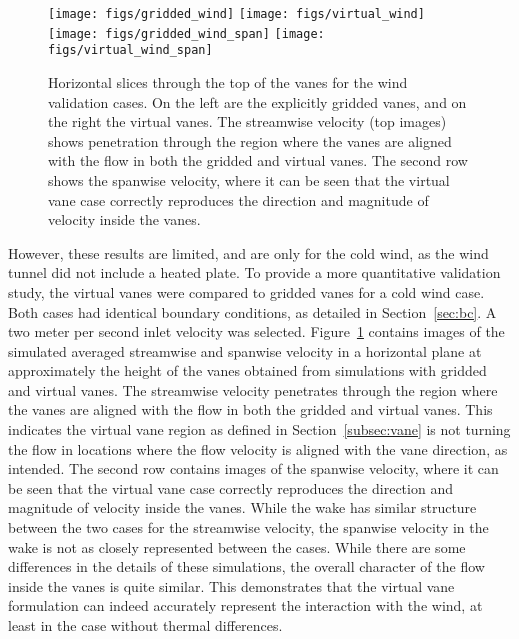 \begin{figure}
  \centering
  \texttt{[image: figs/gridded\_wind]}
  \hfill
  \texttt{[image: figs/virtual\_wind]}
  \\
  \texttt{[image: figs/gridded\_wind\_span]}
  \hfill
  \texttt{[image: figs/virtual\_wind\_span]}
 \caption{Horizontal slices through the top of the vanes for the
 wind validation cases. On the left are the explicitly gridded vanes,
 and on the right the virtual vanes. The streamwise velocity (top
 images) shows penetration through the region where the vanes are aligned
 with the flow in both the gridded and virtual vanes. The second row
 shows the spanwise velocity, where it can be seen that the virtual vane
 case correctly reproduces the direction and magnitude of velocity
 inside the vanes.} 
 \label{fig:wind_val}
\end{figure}

%
%
%
However, these results are limited, and are
only for the cold wind, as the wind tunnel did not include a heated plate.
To provide a more quantitative validation study, the virtual vanes were
compared to gridded vanes for a cold wind case. Both cases had identical
boundary conditions, as detailed in Section~\ref{sec:bc}. A two meter
per second inlet velocity was selected. Figure~\ref{fig:wind_val}
contains images of the simulated averaged 
streamwise and  spanwise velocity in a horizontal plane at approximately
the height of the vanes obtained from simulations with gridded and
virtual vanes. 
The streamwise velocity penetrates through the region where the vanes
are aligned with the flow in both the gridded and virtual vanes. This
indicates the virtual vane region as defined in
Section~\ref{subsec:vane} is not turning the flow in locations where
the flow velocity is aligned with the vane direction, as intended. 
The second row contains images of the spanwise velocity, where it can be
seen that the virtual vane case correctly reproduces the direction and
magnitude of velocity inside the vanes. While the wake has similar
structure between the two cases for the streamwise velocity, the
spanwise velocity in the wake is not as closely represented between the
cases. While there are some differences in the
details of these simulations, the overall character of the flow
inside the vanes is quite similar. This demonstrates that the virtual
vane formulation can indeed accurately represent the interaction with the wind, 
at least in the case without thermal differences.  

